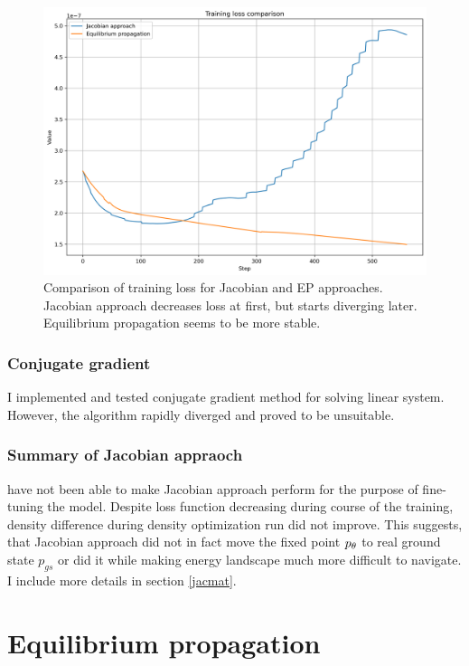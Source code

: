 \documentclass[a4paper,10.5pt]{report}
\begin{document}
\begin{figure}[h!]
 \centering
 \includegraphics[scale=0.5]{images/loss_comparison.png}
 \caption{Comparison of training loss for Jacobian and EP approaches. Jacobian approach decreases loss at first, but starts diverging later. Equilibrium propagation seems to be more stable.}
 \label{fig:jac-eqprop-loss}
\end{figure}


\subsubsection{Conjugate gradient}
I implemented and tested conjugate gradient method for solving linear system. However, the algorithm rapidly diverged and proved to be unsuitable.
\subsubsection{Summary of Jacobian appraoch}

 have not been able to make Jacobian approach perform for the purpose of fine-tuning the model. Despite loss function decreasing during course of the training, density difference during density optimization run did not improve.  This suggests, that Jacobian approach did not in fact move the fixed point $p_\theta$ to real ground state $p_{gs}$ or did it while making energy landscape much more difficult to navigate. I include more details  in section \ref{jacmat}.


\section{ Equilibrium propagation}
\end{document}
